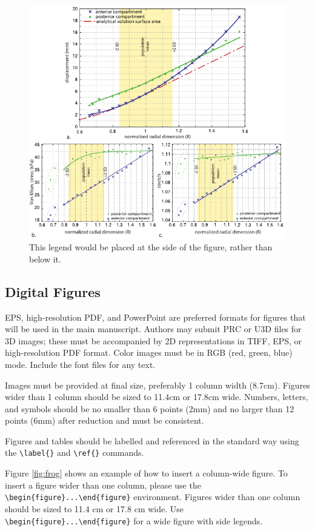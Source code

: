 \documentclass[9pt,twocolumn,twoside,lineno]{pnas-new}
\begin{document}
\begin{figure}
\centering
\includegraphics[width=.8\linewidth]{figs/fig2}
\caption{This legend would be placed at the side of the figure, rather than below it.}\label{fig:side}
\end{figure}

\subsection*{Digital Figures}

EPS, high-resolution PDF, and PowerPoint are preferred formats for figures that will be used in the main manuscript. Authors may submit PRC or U3D files for 3D images; these must be accompanied by 2D representations in TIFF, EPS, or high-resolution PDF format. Color images must be in RGB (red, green, blue) mode. Include the font files for any text.

Images must be provided at final size, preferably 1 column width (8.7cm). Figures wider than 1 column should be sized to 11.4cm or 17.8cm wide. Numbers, letters, and symbols should be no smaller than 6 points (2mm) and no larger than 12 points (6mm) after reduction and must be consistent.

Figures and tables should be labelled and referenced in the standard way using the \verb|\label{}| and \verb|\ref{}| commands.

Figure \ref{fig:frog} shows an example of how to insert a column-wide figure. To insert a figure wider than one column, please use the \verb|\begin{figure}...\end{figure}| environment. Figures wider than one column should be sized to 11.4 cm or 17.8 cm wide. Use \verb|\begin{figure}...\end{figure}| for a wide figure with side legends.
\end{document}

